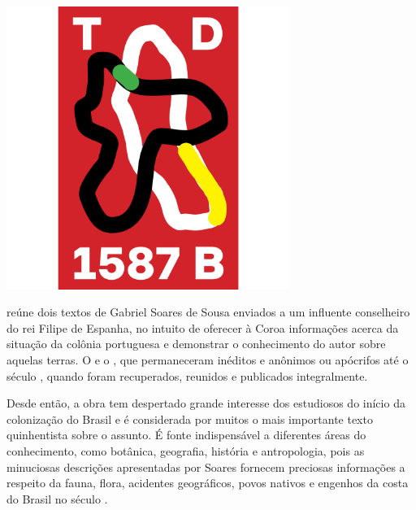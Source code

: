\begin{center}
\hspace*{.5cm}\includegraphics[width=92mm]{./grid/tratado.jpg}
\end{center}

\hspace*{-7cm}\hrulefill\hspace*{-7cm}

\medskip

 reúne dois textos de
Gabriel Soares de Sousa enviados a um influente conselheiro do rei
Filipe  de Espanha, no intuito de oferecer à Coroa informações acerca
da situação da colônia portuguesa e demonstrar o conhecimento do autor
sobre aquelas terras.  O {} e o {}, que permaneceram
inéditos e anônimos ou apócrifos até o século , quando foram
recuperados, reunidos e publicados integralmente.

Desde então, a obra tem despertado grande interesse dos estudiosos do
início da colonização do Brasil e é considerada por muitos o mais
importante texto quinhentista sobre o assunto. É fonte indispensável a
diferentes áreas do conhecimento, como botânica, geografia, história e
antropologia, pois as minuciosas descrições apresentadas por Soares
fornecem preciosas informações a respeito da fauna, flora, acidentes
geográficos, povos nativos e engenhos da costa do Brasil no
século .

\vfill

